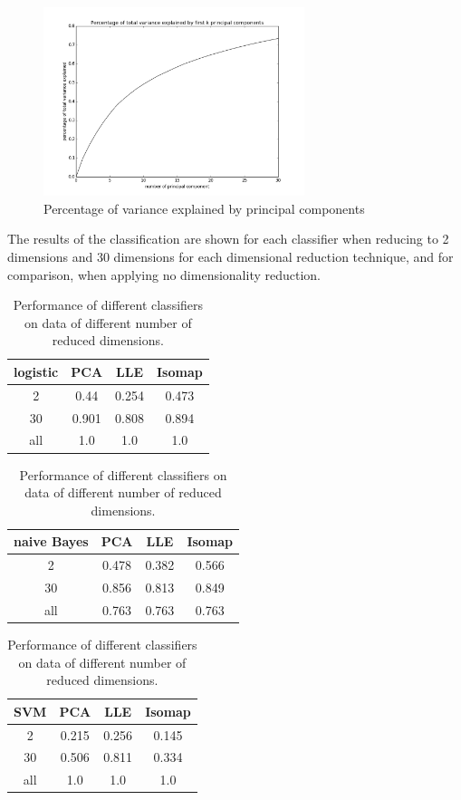 \documentclass[11pt]{article}
\begin{document}
\begin{figure}[H]
\begin{center}
\includegraphics[width=3in]{pca_explained.png}
\end{center}
\caption{Percentage of variance explained by principal components}
\label{pca-variance-explained}
\end{figure}

The results of the classification are shown for each classifier when reducing to 2 dimensions and 30 dimensions for each dimensional reduction technique, and for comparison, when applying no dimensionality reduction.

\begin{table}[H]
\begin{center}
\begin{tabular}{|c|c|c|c|}\hline
logistic & PCA & LLE & Isomap\\\hline
2 & 0.44 & 0.254 & 0.473\\\hline
30 & 0.901 & 0.808 & 0.894\\\hline
all & 1.0 & 1.0 & 1.0\\\hline
\end{tabular}
\begin{tabular}{|c|c|c|c|}\hline
naive Bayes & PCA & LLE & Isomap\\\hline
2 & 0.478 & 0.382 & 0.566\\\hline
30 & 0.856 & 0.813 & 0.849\\\hline
all & 0.763 & 0.763 & 0.763\\\hline
\end{tabular}
\begin{tabular}{|c|c|c|c|}\hline
SVM & PCA & LLE & Isomap\\\hline
2 & 0.215 & 0.256 & 0.145\\\hline
30 & 0.506 & 0.811 & 0.334\\\hline
all & 1.0 & 1.0 & 1.0\\\hline
\end{tabular}
\end{center}
\caption{Performance of different classifiers on data of different number of reduced dimensions. }
\end{table}
\end{document}
